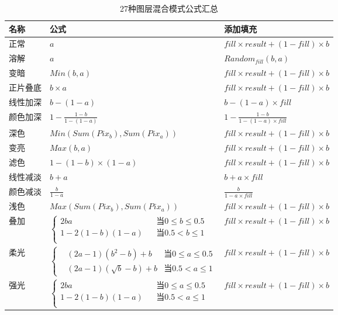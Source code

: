 \begin{table}[htbp]
	\centering
	\caption{ 27种图层混合模式公式汇总}
\begin{tabular}{|l|l|l|}
	\hline
	\textbf{\large {名称}}& \textbf{\large{公式}} &  \textbf{\large{添加填充}}  \\
	\hline
	正常& $a$& $fill\times result+(1-fill)\times b$     \\
	\hline
	溶解 & $a$& $Random_{fill}(b,a)$    \\
	\hline
	变暗 & $Min(b,a)$& $fill\times result+(1-fill)\times b$     \\
	\hline
	正片叠底 &$ b\times a$ & $fill\times result+(1-fill)\times b$    \\
	\hline
	线性加深 & $b-(1-a)$ &  $b-(1-a)\times fill$  \\
	\hline
	颜色加深 & $1-\frac{1-b}{1-(1-a)}$ & $1-\frac{1-b}{1-(1-a)\times fill}$   \\
	\hline
	深色 &$Min(Sum(Pix_b),Sum(Pix_a))$&$fill\times result+(1-fill)\times b$    \\
	\hline
	变亮 &  $Max(b,a)$& $fill\times result+(1-fill)\times b$    \\
	\hline
	滤色 & $1-(1-b)\times (1-a)$ &  $fill\times result+(1-fill)\times b$   \\
	\hline
	线性减淡 &  $b+a$& $b+a\times fill$   \\
	\hline
	颜色减淡&$ \frac{b}{1-a} $&$\frac{b}{1-a\times fill}$    \\
	\hline
	浅色&$Max(Sum(Pix_b),Sum(Pix_a))$&$fill\times result+(1-fill)\times b$    \\
	\hline
	叠加& $\left\{\begin{aligned}2ba&&\text{当} 0\leq b \leq 0.5\\1-2(1-b)(1-a)&&\text{当} 0.5< b \leq 1\\\end{aligned}\right.$ & $fill\times result+(1-fill)\times b$    \\
	\hline
柔光&$\left\{\begin{aligned}&(2a-1)(b^2-b)+b& \text{当}0\leq a \leq 0.5\\&(2a-1)(\sqrt{b}-b)+b&\text{当} 0.5< a \leq 1\end{aligned}\right.$  &$fill\times result+(1-fill)\times b$     \\
	\hline
	强光& $\left\{\begin{aligned}2ba&&\text{当} 0\leq a \leq 0.5\\1-2(1-b)(1-a)&&\text{当} 0.5< a \leq 1\\\end{aligned}\right.$ &$fill\times result+(1-fill)\times b$     \\

\end{tabular}
\end{table}

